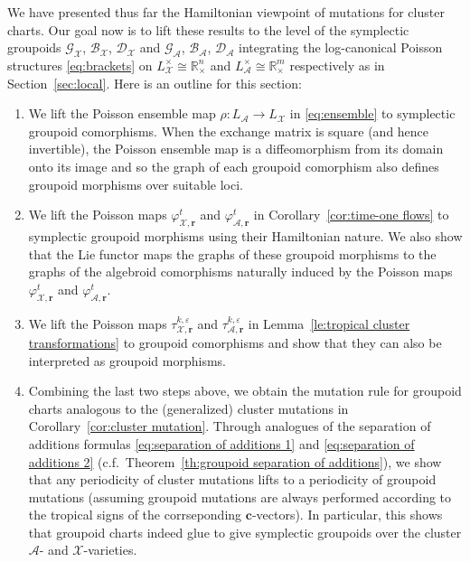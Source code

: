 \documentclass{amsart}
\numberwithin{equation}{section}
\newcommand{\bfc}{\mathbf{c}}
\newcommand{\bfr}{{\boldsymbol{r}}}
\newcommand{\cA}{\mathcal{A}}
\newcommand{\cB}{\mathcal{B}}
\newcommand{\cD}{\mathcal{D}}
\newcommand{\cG}{\mathcal{G}}
\newcommand{\cX}{\mathcal{X}}
\newcommand{\RR}{\mathbb{R}}
\begin{document}
We have presented thus far the Hamiltonian viewpoint of mutations for cluster charts.
Our goal now is to lift these results to the level of the symplectic groupoids $\cG_\cX$, $\cB_\cX$, $\cD_\cX$ and $\cG_\cA$, $\cB_\cA$, $\cD_\cA$ integrating the log-canonical Poisson structures \eqref{eq:brackets} on $L^\times_\cX\cong\RR_\times^n$ and $L^\times_\cA\cong\RR_\times^m$ respectively as in Section~\ref{sec:local}.
Here is an outline for this section:
\begin{enumerate}
  \item We lift the Poisson ensemble map $\rho:L_\cA\to L_\cX$ in \eqref{eq:ensemble} to symplectic groupoid comorphisms.
    When the exchange matrix is square (and hence invertible), the Poisson ensemble map is a diffeomorphism from its domain onto its image and so the graph of each groupoid comorphism also defines groupoid morphisms over suitable loci.
  \item We lift the Poisson maps $\varphi_{\cX,\bfr}^t$ and $\varphi_{\cA,\bfr}^t$ in Corollary~\ref{cor:time-one flows} to symplectic groupoid morphisms using their Hamiltonian nature.
    We also show that the Lie functor maps the graphs of these groupoid morphisms to the graphs of the algebroid comorphisms naturally induced by the Poisson maps $\varphi_{\cX,\bfr}^t$ and $\varphi_{\cA,\bfr}^t$.
  \item We lift the Poisson maps $\tau_{\cX,\bfr}^{k,\varepsilon}$ and $\tau_{\cA,\bfr}^{k,\varepsilon}$ in Lemma~\ref{le:tropical cluster transformations} to groupoid comorphisms and show that they can also be interpreted as groupoid morphisms.
  \item Combining the last two steps above, we obtain the mutation rule for groupoid charts analogous to the (generalized) cluster mutations in Corollary~\ref{cor:cluster mutation}.
    Through analogues of the separation of additions formulas \eqref{eq:separation of additions 1} and \eqref{eq:separation of additions 2} (c.f.\ Theorem~\ref{th:groupoid separation of additions}), we show that any periodicity of cluster mutations lifts to a periodicity of groupoid mutations (assuming groupoid mutations are always performed according to the tropical signs of the corrseponding $\bfc$-vectors).
    In particular, this shows that groupoid charts indeed glue to give symplectic groupoids over the cluster $\cA$- and $\cX$-varieties.
\end{enumerate}
\end{document}
